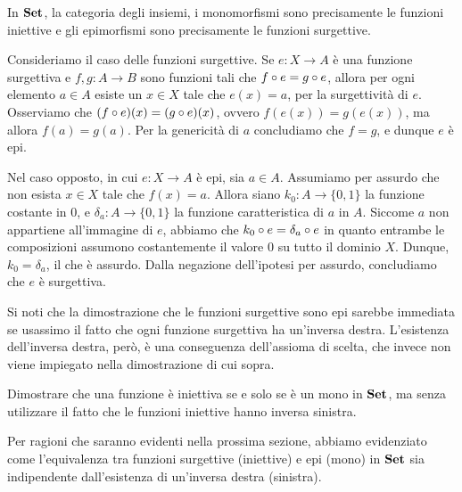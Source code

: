 \begin{example}
	In \(\mathbf{Set}\), la categoria degli insiemi, i monomorfismi sono precisamente le funzioni iniettive
	e gli epimorfismi sono precisamente le funzioni surgettive.

	Consideriamo il caso delle funzioni surgettive.
	Se \(e \colon X \to A\) è una funzione surgettiva e \(f, g \colon A \to B\) sono funzioni tali che \(f \circ e = g \circ e\),
	allora per ogni elemento \(a \in A\) esiste un \(x \in X\) tale che \(e(x) = a\), per la surgettività di \(e\).
	Osserviamo che \((f \circ e)(x) = (g \circ e)(x)\), ovvero \(f(e(x)) = g(e(x))\),
	ma allora \(f(a) = g(a)\).
	Per la genericità di \(a\) concludiamo che \(f = g\), e dunque \(e\) è epi.

	Nel caso opposto, in cui \(e \colon X \to A\) è epi, sia \(a \in A\).
	Assumiamo per assurdo che non esista \(x \in X\) tale che \(f(x) = a\).
	Allora siano \(k_0 \colon A \to \{0, 1\}\) la funzione costante in \(0\),
	e \(\delta_a \colon A \to \{0, 1\}\) la funzione caratteristica di \(a\) in \(A\).
	Siccome \(a\) non appartiene all'immagine di \(e\), abbiamo che \(k_0 \circ e = \delta_a \circ e\)
	in quanto entrambe le composizioni assumono costantemente il valore \(0\) su tutto il dominio \(X\).
	Dunque, \(k_0 = \delta_a\), il che è assurdo.
	Dalla negazione dell'ipotesi per assurdo, concludiamo che \(e\) è surgettiva.
\end{example}

Si noti che la dimostrazione che le funzioni surgettive sono epi sarebbe immediata
se usassimo il fatto che ogni funzione surgettiva ha un'inversa destra.
L'esistenza dell'inversa destra, però, è una conseguenza dell'assioma di scelta,
che invece non viene impiegato nella dimostrazione di cui sopra.

\begin{exercise}
	Dimostrare che una funzione è iniettiva se e solo se è un mono in \(\mathbf{Set}\),
	ma senza utilizzare il fatto che le funzioni iniettive hanno inversa sinistra.
\end{exercise}

Per ragioni che saranno evidenti nella prossima sezione,
abbiamo evidenziato come l'equivalenza tra funzioni surgettive (iniettive)
e epi (mono) in \(\mathbf{Set}\) sia indipendente dall'esistenza di un'inversa destra (sinistra).



